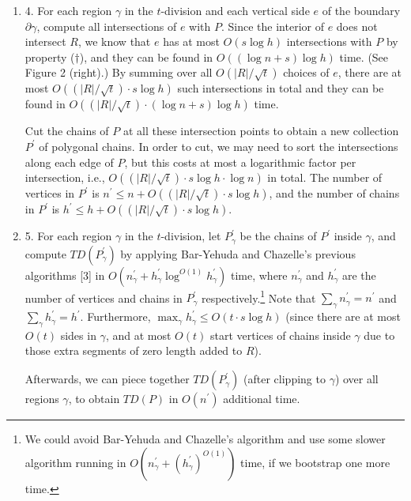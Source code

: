 \begin{enumerate}
\par
\par
\item[]  4. 
For each region $\gamma$ in the $t$-division and each vertical side $e$ of the boundary $\partial\gamma$, compute all intersections of $e$ with $P$. Since the interior of $e$ does not intersect $R$, we know that $e$ has at most $O(s\log h)$ intersections with $P$ by property (${\dagger}$), and they can be found in $O((\log n+s)\log h)$ time. (See Figure 2 (right).) By summing over all $O(|R|/\sqrt{t})$ choices of $e$, there are at most $O((|R|/\sqrt{t})\cdot s\log h)$ such intersections in total and they can be found in $O((|R|/\sqrt{t})\cdot(\log n+s)\log h)$ time.
\par
\par
Cut the chains of $P$ at all these intersection points to obtain a new collection $P^{\prime}$ of polygonal chains. In order to cut, we may need to sort the intersections along each edge of $P$, but this costs at most a logarithmic factor per intersection, i.e., $O((|R|/\sqrt{t})\cdot s\log h\cdot\log n)$ in total. The number of vertices in $P^{\prime}$ is $n^{\prime}\leq n+O((|R|/\sqrt{t})\cdot s\log h)$, and the number of chains in $P^{\prime}$ is $h^{\prime}\leq h+O((|R|/\sqrt{t})\cdot s\log h)$.
\par
\par
\item[]  5. 
For each region $\gamma$ in the $t$-division, let $P^{\prime}_{\gamma}$ be the chains of $P^{\prime}$ inside $\gamma$, and compute $\textit{TD}(P^{\prime}_{\gamma})$ by applying Bar-Yehuda and Chazelle’s previous algorithms [3] in $O(n^{\prime}_{\gamma}+h^{\prime}_{\gamma}\log^{O(1)}h^{\prime}_{\gamma})$ time, where $n^{\prime}_{\gamma}$ and $h^{\prime}_{\gamma}$ are the number of vertices and chains in $P^{\prime}_{\gamma}$ respectively.\footnote{We could avoid Bar-Yehuda and Chazelle’s algorithm and use some slower algorithm running in $O(n^{\prime}_{\gamma}+(h^{\prime}_{\gamma})^{O(1)})$ time, if we bootstrap one more time. } Note that $\sum_{\gamma}n^{\prime}_{\gamma}=n^{\prime}$ and $\sum_{\gamma}h^{\prime}_{\gamma}=h^{\prime}$. Furthermore, $\max_{\gamma}h^{\prime}_{\gamma}\leq O(t\cdot s\log h)$ (since there are at most $O(t)$ sides in $\gamma$, and at most $O(t)$ start vertices of chains inside $\gamma$ due to those extra segments of zero length added to $R$).
\par
\par
Afterwards, we can piece together $\textit{TD}(P^{\prime}_{\gamma})$ (after clipping to $\gamma$) over all regions $\gamma$, to obtain $\textit{TD}(P)$ in $O(n^{\prime})$ additional time.
\par
\par
\end{enumerate}
